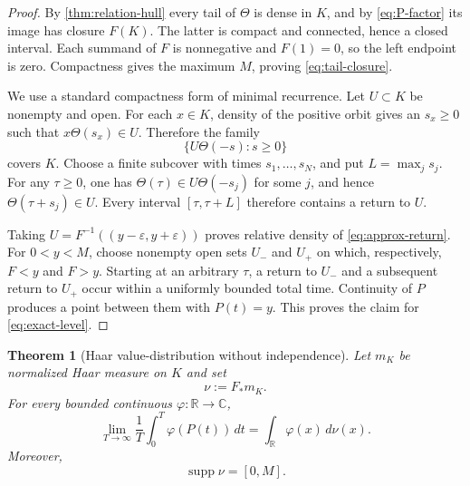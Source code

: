 \documentclass[11pt]{article}
\newtheorem{theorem}{Theorem}[section]
\theoremstyle{remark}
\newcommand{\R}{\mathbb R}
\newcommand{\supp}{\operatorname{supp}}
\begin{document}
\begin{proof}
By \cref{thm:relation-hull} every tail of $\Theta$ is dense in $K$, and by
\eqref{eq:P-factor} its image has closure $F(K)$.  The latter is compact and connected, hence a
closed interval.  Each summand of $F$ is nonnegative and $F(1)=0$, so the left endpoint is zero.
Compactness gives the maximum $M$, proving \eqref{eq:tail-closure}.

We use a standard compactness form of minimal recurrence.  Let $U\subset K$ be nonempty and open.
For each $x\in K$, density of the positive orbit gives an $s_x\geq0$ such that
$x\Theta(s_x)\in U$.  Therefore the family
\[
 \{U\Theta(-s):s\geq0\}
\]
covers $K$.  Choose a finite subcover with times $s_1,\dots,s_N$, and put
$L=\max_j s_j$.  For any $\tau\geq0$, one has
$\Theta(\tau)\in U\Theta(-s_j)$ for some $j$, and hence
$\Theta(\tau+s_j)\in U$.  Every interval $[\tau,\tau+L]$ therefore contains a return to $U$.

Taking $U=F^{-1}((y-\varepsilon,y+\varepsilon))$ proves relative density of
\eqref{eq:approx-return}.  For $0<y<M$, choose nonempty open sets $U_-$ and $U_+$ on which,
respectively, $F<y$ and $F>y$.  Starting at an arbitrary $\tau$, a return to $U_-$ and a subsequent
return to $U_+$ occur within a uniformly bounded total time.  Continuity of $P$ produces a point
between them with $P(t)=y$.  This proves the claim for \eqref{eq:exact-level}.
\end{proof}

\begin{theorem}[Haar value-distribution without independence]\label{thm:Haar-law}
Let $m_K$ be normalized Haar measure on $K$ and set
\begin{equation}\label{eq:nu-def}
 \nu:=F_*m_K.
\end{equation}
For every bounded continuous $\varphi:\R\to\mathbb C$,
\begin{equation}\label{eq:value-distribution}
 \lim_{T\to\infty}\frac1T\int_0^T\varphi(P(t))\,dt
 =\int_\R\varphi(x)\,d\nu(x).
\end{equation}
Moreover,
\begin{equation}\label{eq:support}
 \supp\nu=[0,M].
\end{equation}
\end{theorem}
\end{document}
